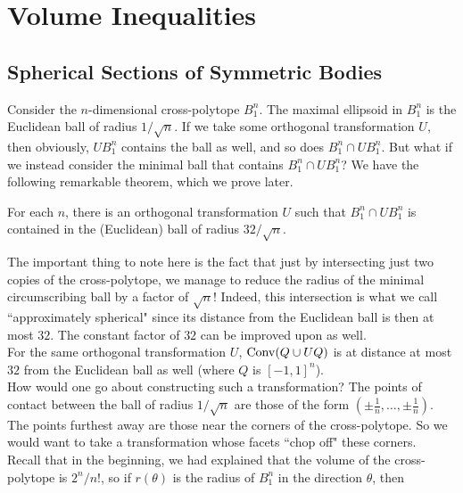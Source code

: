 
\section{Volume Inequalities}

\subsection{Spherical Sections of Symmetric Bodies}

Consider the $n$-dimensional cross-polytope $B_1^n$. The maximal ellipsoid in $B_1^n$ is the Euclidean ball of radius $1/\sqrt{n}$. If we take some orthogonal transformation $U$, then obviously, $U B_1^n$ contains the ball as well, and so does $B_1^n \cap U B_1^n$. But what if we instead consider the minimal ball that contains $B_1^n \cap U B_1^n$? We have the following remarkable theorem, which we prove later.

\begin{theorem}[Ka\u{s}in's Theorem]
\label{cross-polytope Kasin's theorem}
For each $n$, there is an orthogonal transformation $U$ such that $B_1^n\cap U B_1^n$ is contained in the (Euclidean) ball of radius $32/\sqrt{n}$.
\end{theorem}

The important thing to note here is the fact that just by intersecting just two copies of the cross-polytope, we manage to reduce the radius of the minimal circumscribing ball by a factor of $\sqrt{n}$! Indeed, this intersection is what we call ``approximately spherical" since its distance from the Euclidean ball is then at most $32$. The constant factor of $32$ can be improved upon as well.\\

For the same orthogonal transformation $U$, $\operatorname{Conv}(Q\cup U Q)$ is at distance at most $32$ from the Euclidean ball as well (where $Q$ is $[-1,1]^n$).\\

How would one go about constructing such a transformation? The points of contact between the ball of radius $1/\sqrt{n}$ are those of the form $\left(\pm\frac{1}{n},\ldots,\pm\frac{1}{n}\right)$.\\
The points furthest away are those near the corners of the cross-polytope. So we would want to take a transformation whose facets ``chop off" these corners.\\

Recall that in the beginning, we had explained that the volume of the cross-polytope is $2^n/n!$, so if $r(\theta)$ is the radius of $B_1^n$ in the direction $\theta$, then

